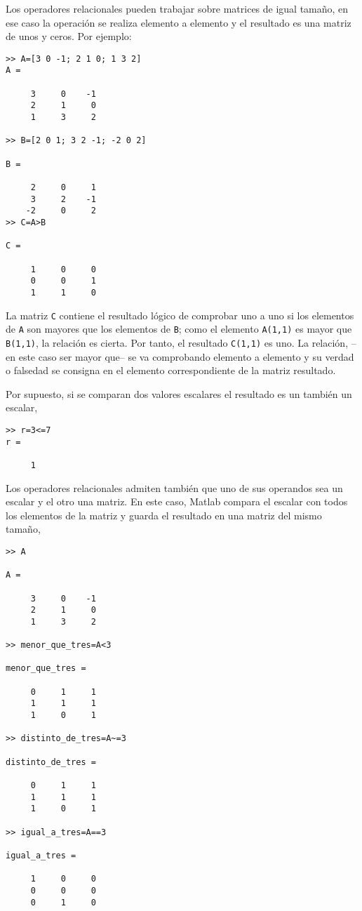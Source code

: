 Los operadores relacionales pueden trabajar sobre matrices de igual tamaño, en ese caso la operación se realiza elemento a elemento y el resultado es una matriz de unos y ceros. Por ejemplo:
\begin{verbatim}
>> A=[3 0 -1; 2 1 0; 1 3 2]
A =

     3     0    -1
     2     1     0
     1     3     2

>> B=[2 0 1; 3 2 -1; -2 0 2]

B =

     2     0     1
     3     2    -1
    -2     0     2
>> C=A>B

C =

     1     0     0
     0     0     1
     1     1     0
\end{verbatim}

La matriz \texttt{C} contiene el resultado lógico de comprobar uno a uno si los elementos de \texttt{A} son mayores que los elementos de \texttt{B}; como el elemento \texttt{A(1,1)} es mayor que \texttt{B(1,1)}, la relación es cierta. Por tanto, el resultado \texttt{C(1,1)} es uno. La relación, --en este caso ser mayor que-- se va comprobando elemento a elemento y su verdad o falsedad se consigna en el elemento correspondiente de la matriz resultado.

Por supuesto, si se comparan dos valores escalares el resultado es un también un escalar,
\begin{verbatim}
>> r=3<=7
r =

     1
\end{verbatim}

Los operadores relacionales admiten también que uno de sus operandos sea un escalar y el otro una matriz. En este caso, Matlab compara el escalar con todos los elementos de la matriz y guarda el resultado en una matriz del mismo tamaño,
\begin{verbatim}
>> A

A =

     3     0    -1
     2     1     0
     1     3     2

>> menor_que_tres=A<3

menor_que_tres =

     0     1     1
     1     1     1
     1     0     1

>> distinto_de_tres=A~=3

distinto_de_tres =

     0     1     1
     1     1     1
     1     0     1

>> igual_a_tres=A==3

igual_a_tres =

     1     0     0
     0     0     0
     0     1     0
\end{verbatim} 

